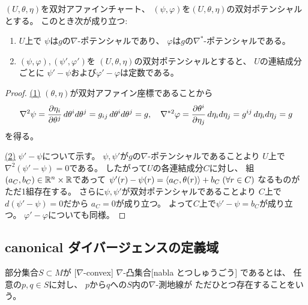 \documentclass[report]{jlreq}
\begin{document}
\begin{proposition}[双対ポテンシャルの基本性質]
    $(U, \theta, \eta)$を双対アファインチャート、
    $(\psi, \varphi)$を$(U, \theta, \eta)$の双対ポテンシャルとする。
    このとき次が成り立つ:
    \begin{enumerate}
        \item $U$上で
            $\psi$は$g$の$\nabla$-ポテンシャルであり、
            $\varphi$は$g$の$\nabla^*$-ポテンシャルである。
        \item $(\psi, \varphi), (\psi', \varphi')$を
            $(U, \theta, \eta)$の双対ポテンシャルとすると、
            $U$の連結成分ごとに
            $\psi' - \psi$および$\varphi' - \varphi$は定数である。
    \end{enumerate}
\end{proposition}

\begin{proof}
    \uline{(1)} \quad
    $(\theta, \eta)$が双対アファイン座標であることから
    \begin{equation}
        \nabla^2 \psi
            =
                \deldel[\eta_i]{\theta^j} \, d\theta^i d\theta^j
            =
                g_{ij} \, d\theta^i d\theta^j
            =
                g,
                \quad
        \nabla^{*2} \varphi
            =
                \deldel[\theta^i]{\eta_j} \, d\eta_i d\eta_j
            =
                g^{ij} \, d\eta_i d\eta_j
            =
                g
    \end{equation}
    を得る。

    \uline{(2)} \quad
    $\psi' - \psi$について示す。
    $\psi, \psi'$が$g$の$\nabla$-ポテンシャルであることより
    $U$上で$\nabla^2 (\psi' - \psi) = 0$である。
    したがって$U$の各連結成分$C$に対し、
    組$(a_C, b_C) \in \mathbb{R}^n \times \mathbb{R}$であって
    $\psi'(r) - \psi(r)
        = \left\langle{a_C},{\theta(r)}\right\rangle + b_C \;
        (\forall r \in C)$
    なるものがただ1組存在する。
    さらに$\psi, \psi'$が双対ポテンシャルであることより
    $C$上で$d(\psi' - \psi) = 0$だから
    $a_C = 0$が成り立つ。
    よって$C$上で$\psi' - \psi = b_C$が成り立つ。
    $\varphi' - \varphi$についても同様。
\end{proof}

\subsection{canonical ダイバージェンスの定義域}

\begin{definition}
    部分集合$S \subset M$が
    [$\nabla$-convex]
        {$\nabla$-凸集合}[nabla とつしゅうごう]
    であるとは、
    任意の$p, q \in S$に対し、
    $p$から$q$への$S$内の$\nabla$-測地線が
    ただひとつ存在することをいう。
\end{definition}
\end{document}

